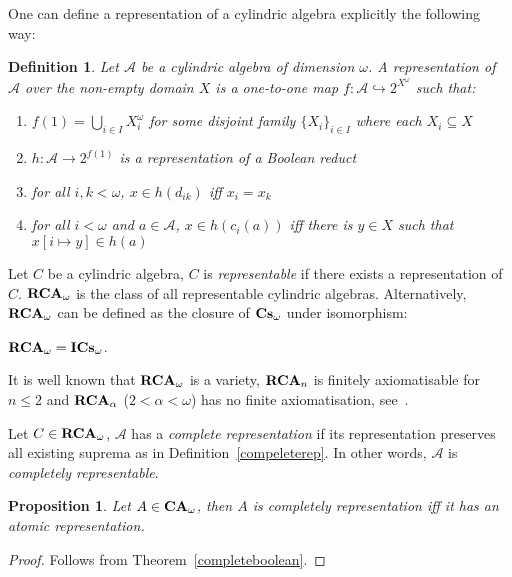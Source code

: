 \documentclass{article}
\theoremstyle{defin}
\newtheorem{definition}{Definition}
\theoremstyle{theorem}
\theoremstyle{claim}
\theoremstyle{prop}
\newtheorem{prop}{Proposition}
\theoremstyle{lemma}
\theoremstyle{fact}
\theoremstyle{remark}
\theoremstyle{ex}
\theoremstyle{col}
\theoremstyle{question}
\begin{document}
One can define a representation of a cylindric algebra explicitly the following way:

\begin{definition}
 Let $\mathcal{A}$ be a cylindric algebra of dimension $\omega$. 
 A \emph{representation} of $\mathcal{A}$ over the non-empty domain $X$ 
 is a one-to-one map $f : \mathcal{A} \hookrightarrow 2^{X^{\omega}}$ such that:
 \begin{enumerate}
   \item $f(1) = \bigcup \limits_{i \in I} X_i^{\omega}$ for some disjoint family ${\{X_i\}}_{i \in I}$ where each 
   $X_i \subseteq X$
   \item $h : \mathcal{A} \to 2^{f(1)}$ is a representation of a Boolean reduct
   \item for all $i, k < \omega$, $x \in h(d_{ik})$ iff $x_{i} = x_{k}$
   \item for all $i < \omega$ and $a \in \mathcal{A}$, $x \in h(c_{i}(a))$ 
   iff there is $y \in X$ such that $x[i \mapsto y] \in h(a)$
 \end{enumerate}
\end{definition}

Let $C$ be a cylindric algebra, $C$ is \emph{representable} 
if there exists a representation of $C$. ${\bf RCA}_{\omega}$ 
is the class of all representable cylindric algebras. 
Alternatively, ${\bf RCA}_{\omega}$ can be defined as the closure of ${\bf Cs}_{\omega}$ under isomorphism:
\begin{center}
${\bf RCA}_{\omega} = {\bf ICs}_{\omega}$.
\end{center}

It is well known that ${\bf RCA}_{\omega}$ is a variety, ${\bf RCA}_n$ is finitely axiomatisable for $n \leq 2$ and 
${\bf RCA}_{\alpha}$ ($2 < \alpha < \omega$) has no finite axiomatisation, 
see~\cite{Henkin1988-HENCAP-4}.

Let $C \in {\bf RCA}_{\omega}$, $\mathcal{A}$ has a \emph{complete representation} if its representation 
preserves all existing suprema as in Definition~\ref{compeleterep}.
In other words, $\mathcal{A}$ is \emph{completely representable}.

\begin{prop}
Let $A \in {\bf CA}_{\omega}$, then $A$ is completely representation iff it has an atomic representation.
\end{prop}

\begin{proof}
Follows from Theorem~\ref{completeboolean}.
\end{proof}
\end{document}
